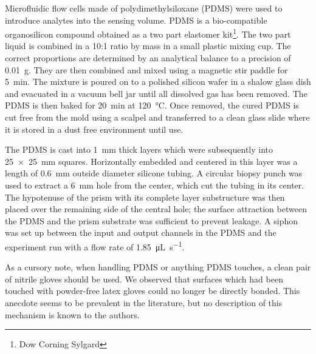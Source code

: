 Microfluidic flow cells made of polydimethylsiloxane (PDMS) were used to
introduce analytes into the sensing volume.  PDMS is a bio-compatible
organosilicon compound obtained as a two part elastomer kit\footnote{Dow
Corning Sylgard}.  The two part liquid is combined in a
10:1 ratio by mass in a small plastic mixing cup.  The correct proportions
are determined by an analytical balance to a precision of \SI{0.01}{\gram}.
They are then combined and mixed using a magnetic stir paddle for
\SI{5}{\minute}.  The mixture is poured on to a polished silicon wafer in a
shalow glass dish and evacuated in a vacuum bell jar until all dissolved
gas has been removed.  The PDMS is then baked for \SI{20}{\minute} at
\SI{120}{\celsius}.  Once removed, the cured PDMS is cut free from the mold
using a scalpel and transferred to a clean glass slide where it is stored
in a dust free environment until use.

The PDMS is cast into \SI{1}{\milli\meter} thick layers which were
subsequently into \SI{25x25}{\milli\meter} squares.  Horizontally embedded
and centered in this layer was a length of \SI{0.6}{\milli\meter} outside
diameter silicone tubing.  A circular biopsy punch was used to extract a
\SI{6}{\milli\meter} hole from the center, which cut the tubing in its
center.  The hypotenuse of the prism with its complete layer substructure
was then placed over the remaining side of the central hole; the surface
attraction between the PDMS and the prism substrate was sufficient to
prevent leakage.  A siphon was set up between the input and output channels
in the PDMS and the experiment run with a flow rate of
\SI{1.85}{\micro\liter\per\second}.  

As a cursory note, when handling PDMS or anything PDMS touches, a clean
pair of nitrile gloves should be used.  We observed that surfaces which had
been touched with powder-free latex gloves could no longer be directly
bonded.  This anecdote seems to be prevalent in the literature, but no
description of this mechanism is known to the authors.
